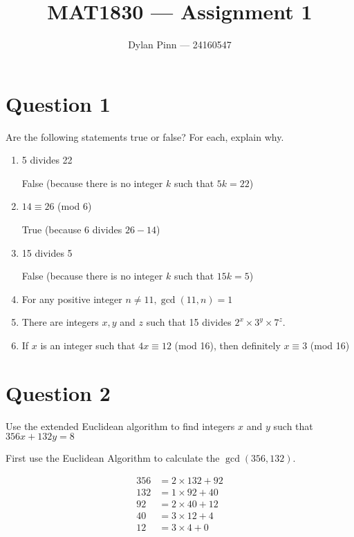 \documentclass[11pt]{article}
\begin{document}
\title{MAT1830 --- Assignment 1}
\author{Dylan Pinn --- 24160547}
\maketitle

\section*{Question 1}
Are the following statements true or false? For each, explain why.
\begin{enumerate}[label= (\alph*)]
\item 5 divides 22

	False (because there is no integer $k$ such that $5k = 22$)

\item $14 \equiv 26$ (mod 6)

	True (because 6 divides $26 - 14$)

\item 15 divides 5

	False (because there is no integer $k$ such that $15k = 5$)

\item For any positive integer $n \neq 11, \gcd(11, n) = 1$


\item There are integers $x, y$ and $z$ such that 15 divides $2^x \times 3^y
  \times 7^z$.


\item If $x$ is an integer such that $4x \equiv 12$ (mod 16), then definitely $x
  \equiv 3$ (mod 16)


\end{enumerate}

\section*{Question 2}
Use the extended Euclidean algorithm to find integers $x$ and $y$ such that
$356x + 132y = 8$

First use the Euclidean Algorithm to calculate the $\gcd(356,132)$.

\begin{align*}
	356 &= 2 \times 132 + 92 \\
	132 &= 1 \times  92 + 40 \\
	 92 &= 2 \times  40 + 12 \\
	 40 &= 3 \times  12 +  4 \\
	 12 &= 3 \times   4 +  0
\end{align*}
\end{document}

